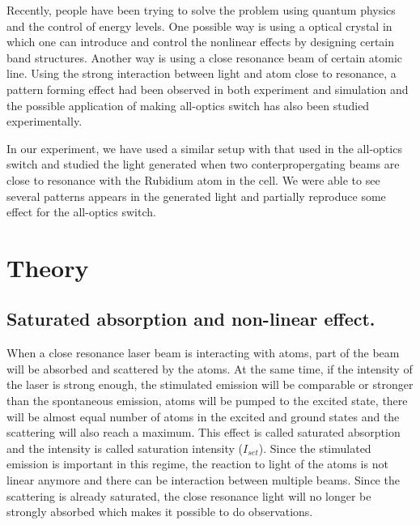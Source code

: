 \documentclass[aps,twocolumn,secnumarabic,balancelastpage,amsmath,amssymb,nofootinbib]{revtex4}
\begin{document}
Recently, people have been trying to solve the problem using quantum physics and the control of energy levels. One possible way is using a optical crystal in which one can introduce and control the nonlinear effects by designing certain band structures. Another way is using a close resonance beam of certain atomic line. Using the strong interaction between light and atom close to resonance, a pattern forming effect had been observed in both experiment\cite{rb_exp} and simulation\cite{rb_sim} and the possible application of making all-optics switch has also been studied experimentally\cite{rb_switch}.

In our experiment, we have used a similar setup with that used in the all-optics switch\cite{rb_switch} and studied the light generated when two conterpropergating beams are close to resonance with the Rubidium atom in the cell. We were able to see several patterns appears in the generated light and partially reproduce some effect for the all-optics switch.

\section{Theory}
\subsection{Saturated absorption and non-linear effect.}
When a close resonance laser beam is interacting with atoms, part of the beam will be absorbed and scattered by the atoms. At the same time, if the intensity of the laser is strong enough, the stimulated emission will be comparable or stronger than the spontaneous emission, atoms will be pumped to the excited state, there will be almost equal number of atoms in the excited and ground states and the scattering will also reach a maximum. This effect is called saturated absorption and the intensity is called saturation intensity ($I_{set}$). Since the stimulated emission is important in this regime, the reaction to light of the atoms is not linear anymore and there can be interaction between multiple beams. Since the scattering is already saturated, the close resonance light will no longer be strongly absorbed which makes it possible to do observations.
\end{document}

